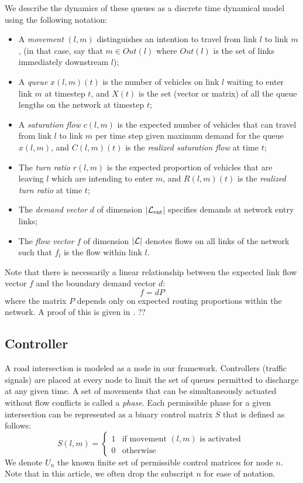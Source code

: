 We describe the dynamics of these queues as a discrete time dynamical model using the following notation: 
\begin{itemize}
\item A \emph{movement} $(l,m)$ distinguishes an intention to travel from link $l$ to link $m$,
(in that case, say that $m \in Out(l)$ where $Out(l)$ is the set of links immediately downstream $l$);
\item A \emph{queue} $x(l,m)(t)$ is the number of vehicles on link $l$ waiting to enter link $m$ at timestep $t$, and $X(t)$ is the set (vector or matrix) of all the queue lengths on the network at timestep $t$;
\item A \emph{saturation flow} $c(l,m)$ is the expected number of vehicles that can travel from link $l$ to link $m$ per time step given maximum demand for the queue $x(l,m)$, and $C(l,m)(t)$ is the \emph{realized saturation flow} at time $t$; 
\item The \emph{turn ratio} $r(l,m)$ is the expected proportion of vehicles that are leaving $l$ which are intending to enter $m$, and $R(l,m)(t)$ is the \emph{realized turn ratio} at time $t$;
\item The \emph{demand vector} $d$ of dimension $|\mathcal{L}_{\text{ent}}|$ specifies demands at network entry links;
\item The \emph{flow vector} $f$ of dimension $|\mathcal{L}|$ denotes flows on all links of the network such that $f_{l}$ is the flow within link $l$. 
\end{itemize}
Note that there is necessarily a linear relationship between the expected link flow vector $f$ and the boundary demand vector $d$: 
\begin{equation} \label{fd_relation}
f=dP
\end{equation}
where the matrix $P$ depends only on expected routing proportions within the network. {\color{red} A proof of this is given in \cite{MaxPressureStochastic}. ?? }



\subsection*{Controller}

A road intersection is modeled as a node in our framework. Controllers (traffic signals) are placed at every node to limit the set of queues permitted to discharge at any given time. A set of movements that can be simultaneously actuated without flow conflicts is called a \emph{phase}.  Each permissible phase for a given intersection can be represented as a binary control matrix $S$ that is defined as follows: 
\begin{equation}
S(l,m) = \begin{cases}
        1 & \text{if movement $(l,m)$ is activated }  \\
        0 & \mbox{otherwise}
    \end{cases}
\end{equation}
We denote $U_n$ the known finite set of permissible control matrices for node $n$. Note that in this article, we often drop the subscript $n$ for ease of notation. 

